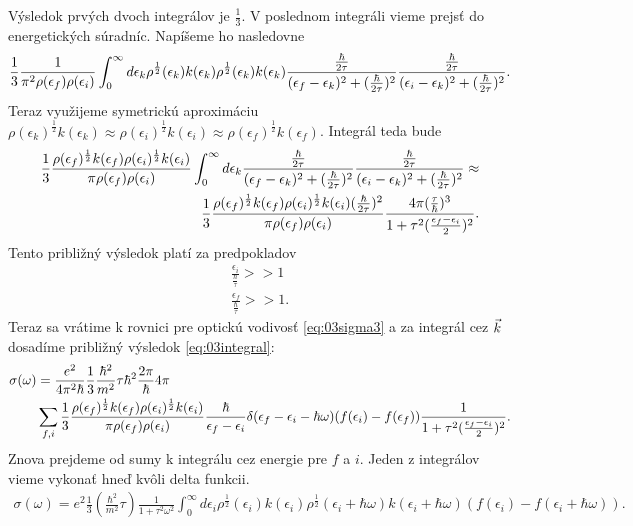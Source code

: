 Výsledok prvých dvoch integrálov je $\frac{1}{3}$. V poslednom integráli vieme prejsť do energetických súradníc. Napíšeme ho nasledovne
\begin{align}
\frac{1}{3}\frac{1}{\pi^2\rho(\epsilon_f)\rho(\epsilon_i)}\int_0^\infty d\epsilon_k \rho^{\frac{1}{2}}(\epsilon_k)k(\epsilon_k)\rho^{\frac{1}{2}}(\epsilon_k)k(\epsilon_k)\frac{\frac{\hbar}{2\tau}}{(\epsilon_f-\epsilon_{k})^2+(\frac{\hbar}{2\tau})^2}\frac{\frac{\hbar}{2\tau}}{(\epsilon_i-\epsilon_{k})^2+(\frac{\hbar}{2\tau})^2}\text{.}
\end{align}
Teraz využijeme symetrickú aproximáciu $\rho(\epsilon_k)^{\frac{1}{2}}k(\epsilon_k)\approx\rho(\epsilon_i)^{\frac{1}{2}}k(\epsilon_i)\approx\rho(\epsilon_f)^{\frac{1}{2}}k(\epsilon_f)$. Integrál teda bude
\begin{align}
\label{eq:03integral}
\frac{1}{3}\frac{\rho(\epsilon_f)^{\frac{1}{2}}k(\epsilon_f)\rho(\epsilon_i)^{\frac{1}{2}}k(\epsilon_i)}{\pi\rho(\epsilon_f)\rho(\epsilon_i)}\int_0^\infty d\epsilon_k\frac{\frac{\hbar}{2\tau}}{(\epsilon_f-\epsilon_{k})^2+(\frac{\hbar}{2\tau})^2}\frac{\frac{\hbar}{2\tau}}{(\epsilon_i-\epsilon_{k})^2+(\frac{\hbar}{2\tau})^2}\approx\\ \notag
\frac{1}{3}\frac{\rho(\epsilon_f)^{\frac{1}{2}}k(\epsilon_f)\rho(\epsilon_i)^{\frac{1}{2}}k(\epsilon_i)(\frac{\hbar}{2\tau})^2}{\pi\rho(\epsilon_f)\rho(\epsilon_i)}\frac{4\pi(\frac{\tau}{\hbar})^3}{1+\tau^2(\frac{\epsilon_f-\epsilon_i}{2})^2}\text{.}
\end{align}
Tento približný výsledok platí za  predpokladov
\begin{align*}
\frac{\epsilon_i}{\frac{\hbar}{\tau}} >> 1\\
\frac{\epsilon_f}{\frac{\hbar}{\tau}} >> 1\text{.}
\end{align*}
Teraz sa vrátime k rovnici pre optickú vodivosť \eqref{eq:03sigma3} a za integrál cez $\vec{k}$ dosadíme približný výsledok \eqref{eq:03integral}:
\begin{align}
\notag
\sigma(\omega)&=\frac{e^2}{4\pi^2\hbar}\frac{1}{3}\frac{\hbar^2}{m^2}\tau\hbar^2\frac{2\pi}{\hbar}4\pi\\
&\sum_{f,i}\frac{1}{3}\frac{\rho(\epsilon_f)^{\frac{1}{2}}k(\epsilon_f)\rho(\epsilon_i)^{\frac{1}{2}}k(\epsilon_i)}{\pi\rho(\epsilon_f)\rho(\epsilon_i)}\frac{\hbar}{\epsilon_f-\epsilon_i}\delta(\epsilon_f-\epsilon_i-\hbar\omega)(f(\epsilon_i)-f(\epsilon_f)) \frac{1}{1+\tau^2(\frac{\epsilon_f-\epsilon_i}{2})^2}
\text{.}
\end{align}
Znova prejdeme od sumy k integrálu cez energie pre $f$ a $i$. Jeden z integrálov vieme vykonať hneď kvôli delta funkcii.
\begin{align}
\sigma(\omega)=e^2\frac{1}{3}(\frac{\hbar^2}{m^2}\tau)\frac{1}{1+\tau^2\omega^2}\int_0^\infty d\epsilon_i\rho^{\frac{1}{2}}(\epsilon_i)k(\epsilon_i)\rho^{\frac{1}{2}}(\epsilon_i+\hbar\omega)k(\epsilon_i+\hbar\omega)(f(\epsilon_i)-f(\epsilon_i+\hbar\omega))\text{.}
\end{align}
